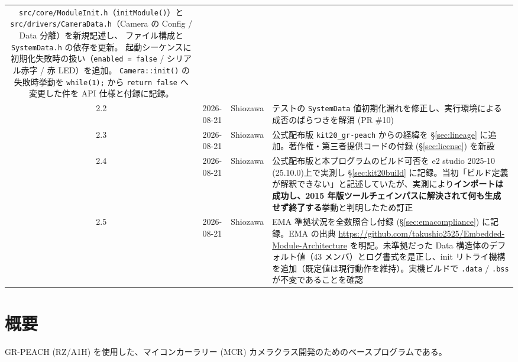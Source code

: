 \documentclass[a4paper,11pt,dvipdfmx]{jsarticle}
\newcommand{\ideversion}{2025-10 (25.10.0)}
\begin{document}
\begin{tabularx}{\textwidth}{c c c X}
  \texttt{src/core/ModuleInit.h}（\texttt{initModule()}）と
  \texttt{src/drivers/CameraData.h}（Camera の Config / Data 分離）を新規記述し、
  ファイル構成と \texttt{SystemData.h} の依存を更新。
  起動シーケンスに初期化失敗時の扱い（\texttt{enabled = false} / シリアル赤字 / 赤 LED）を追加。
  \texttt{Camera::init()} の失敗時挙動を \texttt{while(1);} から \texttt{return false} へ
  変更した件を API 仕様と付録に記録。 \\
2.2 & 2026-08-21 & Shiozawa & テストの \texttt{SystemData} 値初期化漏れを修正し、実行環境による成否のばらつきを解消 (PR \#10) \\
2.3 & 2026-08-21 & Shiozawa & 公式配布版 \texttt{kit20\_gr-peach} からの経緯を \S\ref*{sec:lineage} に追加。著作権・第三者提供コードの付録 (\S\ref*{sec:license}) を新設 \\
2.4 & 2026-08-21 & Shiozawa & 公式配布版と本プログラムのビルド可否を e2 studio \ideversion 上で実測し \S\ref*{sec:kit20build} に記録。当初「ビルド定義が解釈できない」と記述していたが、実測により\textbf{インポートは成功し、2015 年版ツールチェインパスに解決されて何も生成せず終了する}挙動と判明したため訂正 \\
2.5 & 2026-08-21 & Shiozawa & EMA 準拠状況を全数照合し付録 (\S\ref*{sec:emacompliance}) に記録。EMA の出典 \url{https://github.com/takushio2525/Embedded-Module-Architecture} を明記。未準拠だった Data 構造体のデフォルト値（43 メンバ）とログ書式を是正し、init リトライ機構を追加（既定値は現行動作を維持）。実機ビルドで \texttt{.data} / \texttt{.bss} が不変であることを確認 \\
\bottomrule
\end{tabularx}

\newpage
\tableofcontents
\newpage

\section{概要}\label{sec:overview}

GR-PEACH (RZ/A1H) を使用した、マイコンカーラリー (MCR) カメラクラス開発のためのベースプログラムである。
\end{document}
